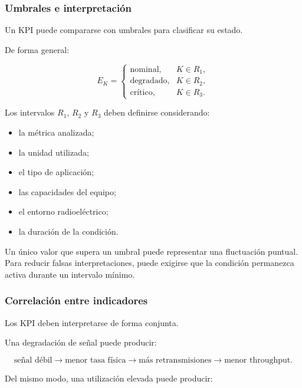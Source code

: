 \subsubsection*{Umbrales e interpretación}

Un KPI puede compararse con umbrales para clasificar su estado.

De forma general:

\[
    E_K
    =
    \begin{cases}
        \text{nominal}, &
        K \in R_1,\\
        \text{degradado}, &
        K \in R_2,\\
        \text{crítico}, &
        K \in R_3.
    \end{cases}
\]

Los intervalos \(R_1\), \(R_2\) y \(R_3\) deben definirse considerando:

\begin{itemize}
    \item la métrica analizada;

    \item la unidad utilizada;

    \item el tipo de aplicación;

    \item las capacidades del equipo;

    \item el entorno radioeléctrico;

    \item la duración de la condición.
\end{itemize}

Un único valor que supera un umbral puede representar una fluctuación
puntual. Para reducir falsas interpretaciones, puede exigirse que la
condición permanezca activa durante un intervalo mínimo.


\subsubsection*{Correlación entre indicadores}

Los KPI deben interpretarse de forma conjunta.

Una degradación de señal puede producir:

\[
    \text{señal débil}
    \longrightarrow
    \text{menor tasa física}
    \longrightarrow
    \text{más retransmisiones}
    \longrightarrow
    \text{menor throughput}.
\]

Del mismo modo, una utilización elevada puede producir:

